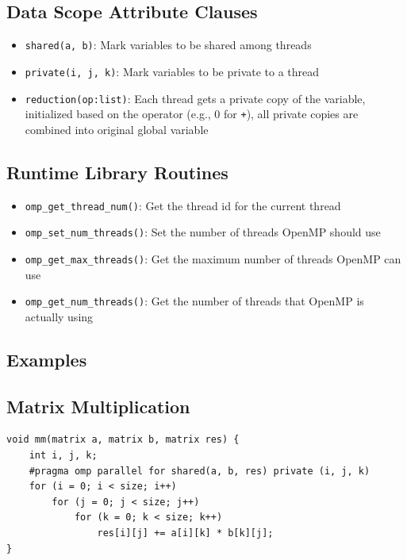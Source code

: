 \documentclass{article}
\begin{document}
\subsection{Data Scope Attribute Clauses}
\begin{itemize}
    \item \texttt{shared(a, b)}: Mark variables to be shared among threads

    \item \texttt{private(i, j, k)}: Mark variables to be private to a thread

    \item \texttt{reduction(op:list)}: Each thread gets a private copy of the variable, initialized based on the operator (e.g., 0 for \texttt{+}), all private copies are combined into original global variable
\end{itemize}

\subsection{Runtime Library Routines}
\begin{itemize}
    \item \texttt{omp\_get\_thread\_num()}: Get the thread id for the current thread

    \item \texttt{omp\_set\_num\_threads()}: Set the number of threads OpenMP should use

    \item \texttt{omp\_get\_max\_threads()}: Get the maximum number of threads OpenMP can use

    \item \texttt{omp\_get\_num\_threads()}: Get the number of threads that OpenMP is actually using
\end{itemize}

\subsection{Examples}
\subsection{Matrix Multiplication}
\begin{lstlisting}
void mm(matrix a, matrix b, matrix res) {
    int i, j, k;
    #pragma omp parallel for shared(a, b, res) private (i, j, k)
    for (i = 0; i < size; i++)
        for (j = 0; j < size; j++)
            for (k = 0; k < size; k++)
                res[i][j] += a[i][k] * b[k][j];
}
\end{lstlisting}
\end{document}

